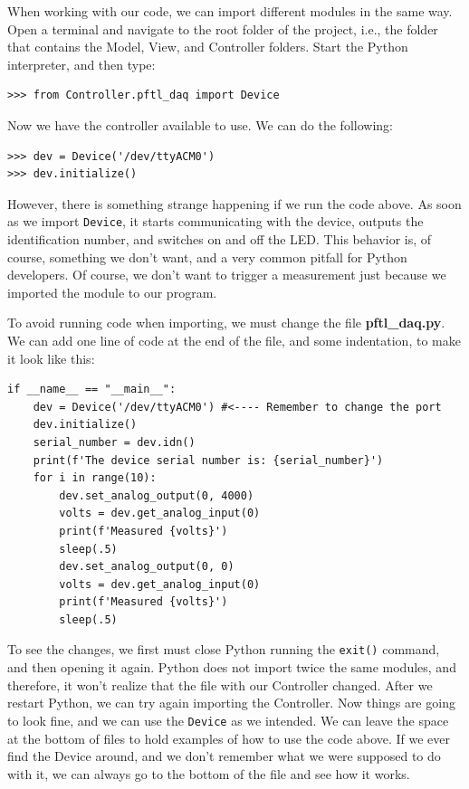 When working with our code, we can import different modules in the same way. Open a terminal and navigate to the root folder of the project, i.e., the folder that contains the Model, View, and Controller folders. Start the Python interpreter, and then type:

\begin{verbatim}
>>> from Controller.pftl_daq import Device
\end{verbatim}

Now we have the controller available to use. We can do the following:

\begin{verbatim}
>>> dev = Device('/dev/ttyACM0')
>>> dev.initialize()
\end{verbatim}

However, there is something strange happening if we run the code above. As soon as we import \texttt{Device}, it starts communicating with the device, outputs the identification number, and switches on and off the LED. This behavior is, of course, something we don't want, and a very common pitfall for Python developers. Of course, we don't want to trigger a measurement just because we imported the module to our program.

To avoid running code when importing, we must change the file \textbf{pftl\_daq.py}. We can add one line of code at the end of the file, and some indentation, to make it look like this:

\begin{verbatim}
if __name__ == "__main__":
    dev = Device('/dev/ttyACM0') #<---- Remember to change the port
    dev.initialize()
    serial_number = dev.idn()
    print(f'The device serial number is: {serial_number}')
    for i in range(10):
        dev.set_analog_output(0, 4000)
        volts = dev.get_analog_input(0)
        print(f'Measured {volts}')
        sleep(.5)
        dev.set_analog_output(0, 0)
        volts = dev.get_analog_input(0)
        print(f'Measured {volts}')
        sleep(.5)
\end{verbatim}

To see the changes, we first must close Python running the \texttt{exit()} command, and then opening it again. Python does not import twice the same modules, and therefore, it won't realize that the file with our Controller changed. After we restart Python, we can try again importing the Controller. Now things are going to look fine, and we can use the \texttt{Device} as we intended. We can leave the space at the bottom of files to hold examples of how to use the code above. If we ever find the Device around, and we don't remember what we were supposed to do with it, we can always go to the bottom of the file and see how it works.

